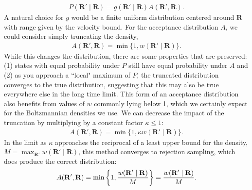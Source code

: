 \documentclass[12pt,letterpaper]{article}
\newcommand{\mb}{\mathbf}
\begin{document}
\begin{itemize}
\begin{align*}
P(\mb{R}' \mid \mb{R}) = g(\mb{R}' \mid \mb{R})A(\mb{R}', \mb{R}).
\end{align*}
A natural choice for $g$ would be a finite uniform distribution centered around $\mb{R}$ with range given by the velocity bound. For the acceptance distribution $A$, we could consider simply truncating the density,
\begin{align*}
A(\mb{R}', \mb{R}) = \min\{1, w(\mb{R}' \mid \mb{R})\}.
\end{align*}
While this changes the distribution, there are some properties that are preserved: (1) states with equal probability under $P$ still have equal probability under $A$ and (2) as you approach a ``local" maximum of $P$, the truncated distribution converges to the true distribution, suggesting that this may also be true everywhere else in the long time limit. This form of an acceptance distribution also benefits from values of $w$ commonly lying below 1, which we certainly expect for the Boltzmannian densities we use. We can decrease the impact of the truncation by multiplying by a constant factor $\kappa \leqslant 1$:
\begin{align*}
A(\mb{R}', \mb{R}) = \min\{1, \kappa w(\mb{R}' \mid \mb{R})\}.
\end{align*}
In the limit as $\kappa$ approaches the reciprocal of a least upper bound for the density, $M = \max_{\mb{R}'}w(\mb{R}' \mid \mb{R})$, this method converges to rejection sampling, which does produce the correct distribution:
\begin{align*}
A(\mb{R}', \mb{R}) = \min\left\{1, {w(\mb{R}' \mid \mb{R}) \over M}\right\} = {w(\mb{R}' \mid \mb{R}) \over M}.
\end{align*}



\end{itemize}
\end{document}
